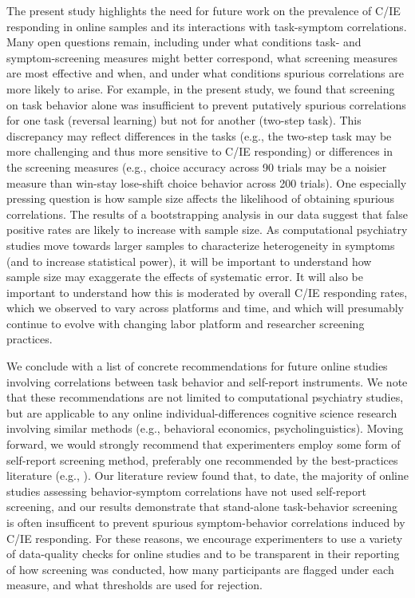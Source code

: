 \documentclass[a4paper,notitlepage,12pt]{article}
\begin{document}
The present study highlights the need for future work on the prevalence of C/IE responding in online samples and its interactions with task-symptom correlations. Many open questions remain, including under what conditions task- and symptom-screening measures might better correspond, what screening measures are most effective and when, and under what conditions spurious correlations are more likely to arise. For example, in the present study, we found that screening on task behavior alone was insufficient to prevent putatively spurious correlations for one task (reversal learning) but not for another (two-step task). This discrepancy may reflect differences in the tasks (e.g., the two-step task may be more challenging and thus more sensitive to C/IE responding) or differences in the screening measures (e.g., choice accuracy across 90 trials may be a noisier measure than win-stay lose-shift choice behavior across 200 trials). One especially pressing question is how sample size affects the likelihood of obtaining spurious correlations. The results of a bootstrapping analysis in our data suggest that false positive rates are likely to increase with sample size. As computational psychiatry studies move towards larger samples to characterize heterogeneity in symptoms (and to increase statistical power), it will be important to understand how sample size may exaggerate the effects of systematic error. It will also be important to understand how this is moderated by overall C/IE responding rates, which we observed to vary across platforms and time, and which will presumably continue to evolve with changing labor platform and researcher screening practices.

We conclude with a list of concrete recommendations for future online studies involving correlations between task behavior and self-report instruments. We note that these recommendations are not limited to computational psychiatry studies, but are applicable to any online individual-differences cognitive science research involving similar methods (e.g., behavioral economics, psycholinguistics). Moving forward, we would strongly recommend that experimenters employ some form of self-report screening method, preferably one recommended by the best-practices literature (e.g., \cite{huang2015insufficient, curran2016methods, thomas2017validity, desimone2018dirty, ophir2020turker}). Our literature review found that, to date, the majority of online studies assessing behavior-symptom correlations have not used self-report screening, and our results demonstrate that stand-alone task-behavior screening is often insufficent to prevent spurious symptom-behavior correlations induced by C/IE responding. For these reasons, we encourage experimenters to use a variety of data-quality checks for online studies and to be transparent in their reporting of how screening was conducted, how many participants are flagged under each measure, and what thresholds are used for rejection.
\end{document}

